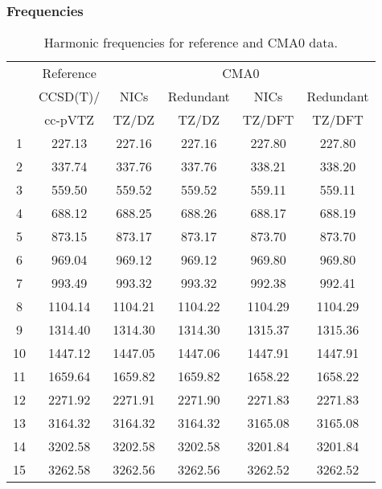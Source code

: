 \documentclass[10pt,oneside]{article}
\begin{document}
\begin{table}[h!]
\subsubsection*{Frequencies}
\centering
\caption{Harmonic frequencies for reference and CMA0 data.}
\begin{tabular}{cccccc}
\toprule
{} & Reference & \multicolumn{4}{c}{CMA0} \\
{} &  CCSD(T)/ &    NICs &  Redundant &    NICs & Redundant \\
{} &   cc-pVTZ &   TZ/DZ &      TZ/DZ &  TZ/DFT &    TZ/DFT \\
\midrule
1  &    227.13 &  227.16 &     227.16 &  227.80 &    227.80 \\
2  &    337.74 &  337.76 &     337.76 &  338.21 &    338.20 \\
3  &    559.50 &  559.52 &     559.52 &  559.11 &    559.11 \\
4  &    688.12 &  688.25 &     688.26 &  688.17 &    688.19 \\
5  &    873.15 &  873.17 &     873.17 &  873.70 &    873.70 \\
6  &    969.04 &  969.12 &     969.12 &  969.80 &    969.80 \\
7  &    993.49 &  993.32 &     993.32 &  992.38 &    992.41 \\
8  &   1104.14 & 1104.21 &    1104.22 & 1104.29 &   1104.29 \\
9  &   1314.40 & 1314.30 &    1314.30 & 1315.37 &   1315.36 \\
10 &   1447.12 & 1447.05 &    1447.06 & 1447.91 &   1447.91 \\
11 &   1659.64 & 1659.82 &    1659.82 & 1658.22 &   1658.22 \\
12 &   2271.92 & 2271.91 &    2271.90 & 2271.83 &   2271.83 \\
13 &   3164.32 & 3164.32 &    3164.32 & 3165.08 &   3165.08 \\
14 &   3202.58 & 3202.58 &    3202.58 & 3201.84 &   3201.84 \\
15 &   3262.58 & 3262.56 &    3262.56 & 3262.52 &   3262.52 \\
\bottomrule
\end{tabular}
\end{table}
\end{document}
